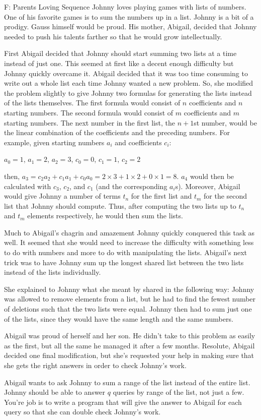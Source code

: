 \begin{problem}{F: Parents Loving Sequence}
Johnny loves playing games with lists of numbers.
One of his favorite games is to sum the numbers up in a list.
Johnny is a bit of a prodigy.
Gauss himself would be proud.
His mother, Abigail, decided that Johnny needed to push his talents farther so that he would grow intellectually.

First Abigail decided that Johnny should start summing two lists at a time instead of just one.
This seemed at first like a decent enough difficulty but Johnny quickly overcame it.
Abigail decided that it was too time consuming to write out a whole list each time Johnny wanted a new problem.
So, she modified the problem slightly to give Johnny two formulas for generating the lists instead of the lists themselves.
The first formula would consist of $n$ coefficients and $n$ starting numbers.
The second formula would consist of $m$ coefficients and $m$ starting numbers.
The next number in the first list, the $n+1$st number, would be the linear combination of the coefficients and the preceding numbers.
For example, given starting numbers $a_i$ and coefficients $c_i$:

$a_0 = 1$, $a_1 = 2$, $a_2 = 3$, $c_0 = 0$, $c_1 = 1$, $c_2 = 2$

then, $a_3 = c_2a_2 + c_1a_1 + c_0a_0 = 2\times 3 + 1\times 2 + 0\times 1 = 8$.
$a_4$ would then be calculated with $c_3$, $c_2$, and $c_1$ (and the corresponding $a_i$s).
Moreover, Abigail would give Johnny a number of terms $t_n$ for the first list and $t_m$ for the second list that Johnny should compute.
Thus, after computing the two lists up to $t_n$ and $t_m$ elements respectively, he would then sum the lists.

Much to Abigail's chagrin and amazement Johnny quickly conquered this task as well.
It seemed that she would need to increase the difficulty with something less to do with numbers and more to do with manipulating the lists.
Abigail's next trick was to have Johnny sum up the longest shared list between the two lists instead of the lists individually.

She explained to Johnny what she meant by shared in the following way:
Johnny was allowed to remove elements from a list, but he had to find the fewest number of deletions such that the two lists were equal.
Johnny then had to sum just one of the lists, since they would have the same length and the same numbers.

Abigail was proud of herself and her son.
He didn't take to this problem as easily as the first, but all the same he managed it after a few months.
Resolute, Abigail decided one final modification, but she's requested your help in making sure that she gets the right answers in order to check Johnny's work.

Abigail wants to ask Johnny to sum a range of the list instead of the entire list.
Johnny should be able to answer $q$ queries by range of the list, not just a few.
You're job is to write a program that will give the answer to Abigail for each query so that she can double check Johnny's work.
\end{problem}
